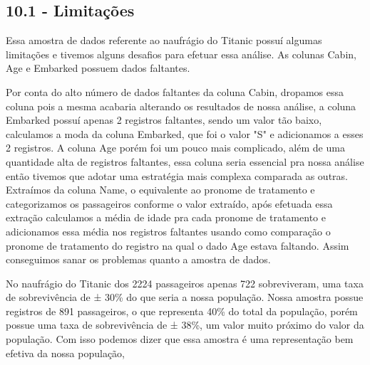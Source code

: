 \documentclass[11pt]{article}
\begin{document}
    \subsection{10.1 - Limitações}\label{limitauxe7uxf5es}

Essa amostra de dados referente ao naufrágio do Titanic possuí algumas
limitações e tivemos alguns desafios para efetuar essa análise. As
colunas Cabin, Age e Embarked possuem dados faltantes.

Por conta do alto número de dados faltantes da coluna Cabin, dropamos
essa coluna pois a mesma acabaria alterando os resultados de nossa
análise, a coluna Embarked possuí apenas 2 registros faltantes, sendo um
valor tão baixo, calculamos a moda da coluna Embarked, que foi o valor
"S" e adicionamos a esses 2 registros. A coluna Age porém foi um pouco
mais complicado, além de uma quantidade alta de registros faltantes,
essa coluna seria essencial pra nossa análise então tivemos que adotar
uma estratégia mais complexa comparada as outras. Extraímos da coluna
Name, o equivalente ao pronome de tratamento e categorizamos os
passageiros conforme o valor extraído, após efetuada essa extração
calculamos a média de idade pra cada pronome de tratamento e adicionamos
essa média nos registros faltantes usando como comparação o pronome de
tratamento do registro na qual o dado Age estava faltando. Assim
conseguimos sanar os problemas quanto a amostra de dados.

No naufrágio do Titanic dos 2224 passageiros apenas 722 sobreviveram,
uma taxa de sobrevivência de ± 30\% do que seria a nossa população.
Nossa amostra possue registros de 891 passageiros, o que representa 40\%
do total da população, porém possue uma taxa de sobrevivência de ± 38\%,
um valor muito próximo do valor da população. Com isso podemos dizer que
essa amostra é uma representação bem efetiva da nossa população,


    
    
    
    
\end{document}
